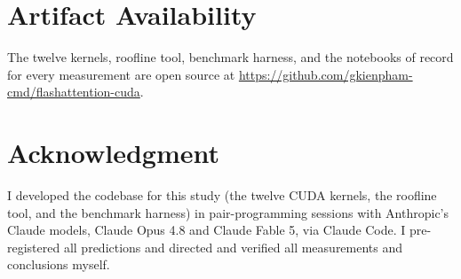 \documentclass[conference]{IEEEtran}
\begin{document}








\section*{Artifact Availability}
The twelve kernels, roofline tool, benchmark harness, and the notebooks of record
for every measurement are open source at
\url{https://github.com/gkienpham-cmd/flashattention-cuda}.

\section*{Acknowledgment}
I developed the codebase for this study (the twelve CUDA kernels, the roofline
tool, and the benchmark harness) in pair-programming sessions with Anthropic's
Claude models, Claude Opus 4.8 and Claude Fable 5, via Claude Code. I
pre-registered all predictions and directed and verified all measurements and
conclusions myself.



\end{document}
